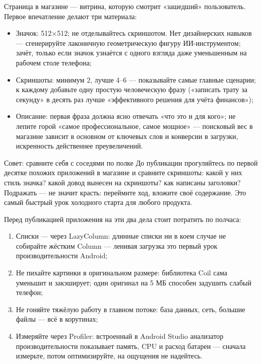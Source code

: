 Страница в магазине — витрина, которую смотрит «зашедший» пользователь. Первое впечатление делают три материала:

\begin{itemize}
  \item Значок: 512×512; не отделывайтесь скриншотом. Нет дизайнерских навыков — сгенерируйте лаконичную геометрическую фигуру ИИ-инструментом; зачёт, только если значок узнаётся с одного взгляда даже уменьшенным на рабочем столе телефона;
  \item Скриншоты: минимум 2, лучше 4–6 — показывайте самые главные сценарии; к каждому добавьте одну простую человеческую фразу («записать трату за секунду» в десять раз лучше «эффективного решения для учёта финансов»);
  \item Описание: первая фраза должна ясно отвечать «что это и для кого»; не лепите горой «самое профессиональное, самое мощное» — поисковый вес в магазине зависит в основном от ключевых слов и конверсии в загрузки, искренность действеннее преувеличений.
\end{itemize}

\begin{tcbinfo}{Совет: сравните себя с соседями по полке}
До публикации прогуляйтесь по первой десятке похожих приложений в магазине и сравните скриншоты: какой у них стиль значка? какой довод вынесен на скриншоты? как написаны заголовки? Подражать — не значит красть: переймите ход, вложите своё содержание. Это самый быстрый урок холодного старта для любого продукта.

\end{tcbinfo}


Перед публикацией приложения на эти два дела стоит потратить по полчаса:


\begin{enumerate}
  \item Списки — через LazyColumn: длинные списки ни в коем случае не собирайте жёстким Column — ленивая загрузка это первый урок производительности Android;
  \item Не пихайте картинки в оригинальном размере: библиотека Coil сама уменьшит и закэширует; один оригинал на 5 МБ способен задушить слабый телефон;
  \item Не гоняйте тяжёлую работу в главном потоке: база данных, сеть, большие файлы — всё в корутинах;
  \item Измеряйте через Profiler: встроенный в Android Studio анализатор производительности показывает память, CPU и расход батареи — сначала измерьте, потом оптимизируйте, на ощущения не надейтесь.
\end{enumerate}

